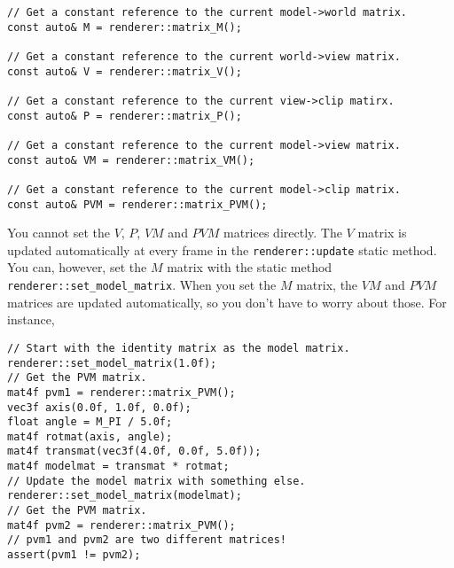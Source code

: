 \documentclass{article}
\begin{document}
\begin{lstlisting}
// Get a constant reference to the current model->world matrix.
const auto& M = renderer::matrix_M();

// Get a constant reference to the current world->view matrix.
const auto& V = renderer::matrix_V();

// Get a constant reference to the current view->clip matirx.
const auto& P = renderer::matrix_P();

// Get a constant reference to the current model->view matrix.
const auto& VM = renderer::matrix_VM();

// Get a constant reference to the current model->clip matrix.
const auto& PVM = renderer::matrix_PVM();
\end{lstlisting}
You cannot set the $V$, $P$, $VM$ and $PVM$ matrices directly.
The $V$ matrix is updated automatically at every frame in the \texttt{renderer::update} static method.
You can, however, set the $M$ matrix with the static method \texttt{renderer::set\_model\_matrix}. When you set the $M$ matrix, the $VM$ and $PVM$ matrices are updated automatically, so you don't have to worry about those. For instance,
\begin{lstlisting}
// Start with the identity matrix as the model matrix.
renderer::set_model_matrix(1.0f);
// Get the PVM matrix.
mat4f pvm1 = renderer::matrix_PVM();
vec3f axis(0.0f, 1.0f, 0.0f);
float angle = M_PI / 5.0f;
mat4f rotmat(axis, angle);
mat4f transmat(vec3f(4.0f, 0.0f, 5.0f));
mat4f modelmat = transmat * rotmat;
// Update the model matrix with something else.
renderer::set_model_matrix(modelmat);
// Get the PVM matrix.
mat4f pvm2 = renderer::matrix_PVM();
// pvm1 and pvm2 are two different matrices!
assert(pvm1 != pvm2);
\end{lstlisting}
\end{document}
